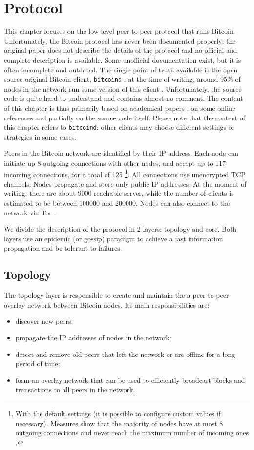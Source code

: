 \chapter{Protocol}
\label{chapter:protocol}
This chapter focuses on the low-level peer-to-peer protocol that runs Bitcoin.
Unfortunately, the Bitcoin protocol has never been documented properly:
the original paper \cite{bitcoin_2009} does not describe the details of the protocol and no official and complete description is available.
Some unofficial documentation exist, but it is often incomplete and outdated.
The single point of truth available is the open-source original Bitcoin client, \texttt{bitcoind} \cite{bitcoin_github}:
at the time of writing, around \num{95}\% of nodes in the network run some version of this client \cite{bitnodes}.
Unfortunately, the source code is quite hard to understand and contains almost no comment.
The content of this chapter is thus primarily based on academical papers \cite{eclipse_attack_2015, deanonymization_2014}, on some online references \cite{bitcoin_reference, bitcoin_guide} and partially on the source code itself.
Please note that the content of this chapter refers to \texttt{bitcoind}:
other clients may choose different settings or strategies in some cases.

\bigskip
Peers in the Bitcoin network are identified by their IP address.
Each node can initiate up \num{8} outgoing connections with other nodes, and accept up to \num{117} incoming connections, for a total of \num{125} \footnote{With the default settings (it is possible to configure custom values if necessary). Measures show that the majority of nodes have at most \num{8} outgoing connections and never reach the maximum number of incoming ones \cite{discovering_influential_nodes_2014}.}.
All connections use unencrypted TCP channels.
Nodes propagate and store only public IP addresses.
At the moment of writing, there are about \num{9000} reachable server, while the number of clients is estimated to be between \num{100000} and \num{200000}.
Nodes can also connect to the network via Tor \cite{bicoin_tor}.

\bigskip
We divide the description of the protocol in \num{2} layers: topology and core.
Both layers use an epidemic (or gossip) paradigm \cite{gossip_1987} to achieve a fast information propagation and be tolerant to failures.

\section{Topology}
The topology layer is responsible to create and maintain the a peer-to-peer overlay network between Bitcoin nodes.
Its main responsibilities are:
\begin{itemize}
	\item discover new peers;
	\item propagate the IP addresses of nodes in the network;
	\item detect and remove old peers that left the network or are offline for a long period of time;
	\item form an overlay network that can be used to efficiently broadcast blocks and transactions to all peers in the network.
\end{itemize}

